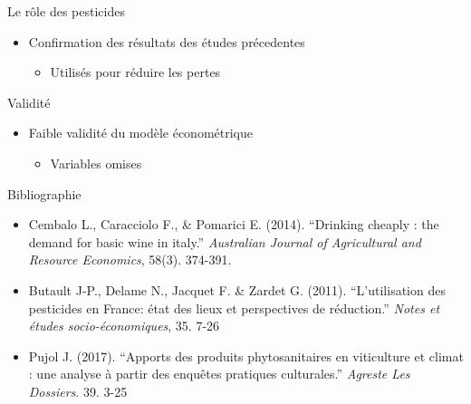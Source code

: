 \documentclass[11pt,ignorenonframetext,]{beamer}
\providecommand{\tightlist}{%
  \setlength{\itemsep}{0pt}\setlength{\parskip}{0pt}}
\begin{document}
\begin{frame}{Le rôle des pesticides}
\protect\hypertarget{le-role-des-pesticides}{}

\begin{itemize}
\tightlist
\item
  Confirmation des résultats des études précedentes

  \begin{itemize}
  \tightlist
  \item
    Utilisés pour réduire les pertes
  \end{itemize}
\end{itemize}

\end{frame}

\begin{frame}{Validité}
\protect\hypertarget{validite}{}

\begin{itemize}
\tightlist
\item
  Faible validité du modèle économétrique

  \begin{itemize}
  \tightlist
  \item
    Variables omises
  \end{itemize}
\end{itemize}

\end{frame}

\begin{frame}{Bibliographie}
\protect\hypertarget{bibliographie}{}

\begin{itemize}
\tightlist
\item
  Cembalo L., Caracciolo F., \& Pomarici E. (2014). ``Drinking cheaply :
  the demand for basic wine in italy.'' \emph{Australian Journal of
  Agricultural and Resource Economics}, 58(3). 374-391.
\item
  Butault J-P., Delame N., Jacquet F. \& Zardet G. (2011).
  ``L'utilisation des pesticides en France: état des lieux et
  perspectives de réduction.'' \emph{Notes et études socio-économiques},
  35. 7-26
\item
  Pujol J. (2017). ``Apports des produits phytosanitaires en viticulture
  et climat : une analyse à partir des enquêtes pratiques culturales.''
  \emph{Agreste Les Dossiers}. 39. 3-25
\end{itemize}

\end{frame}
\end{document}
